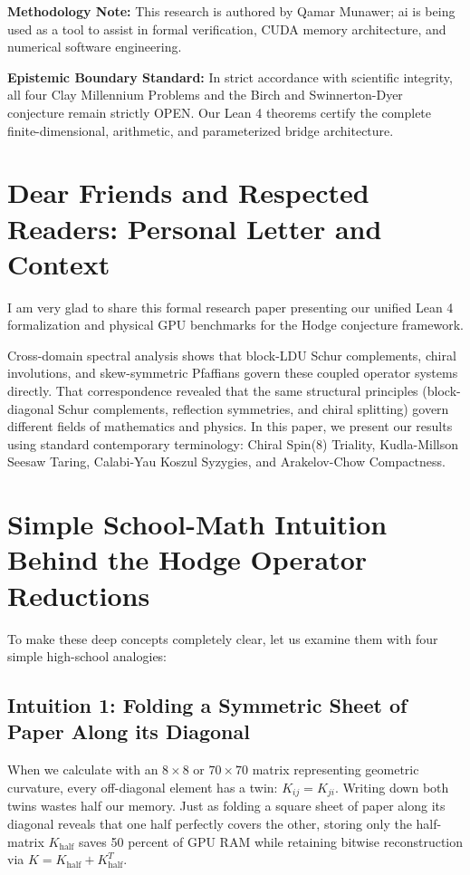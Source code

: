 \documentclass[11pt,a4paper]{article}
\begin{document}
\vspace{0.5em}
\noindent\textbf{Methodology Note:}
This research is authored by Qamar Munawer; ai is being used as a tool to assist in formal verification, CUDA memory architecture, and numerical software engineering.

\vspace{0.5em}
\noindent\textbf{Epistemic Boundary Standard:}
In strict accordance with scientific integrity, all four Clay Millennium Problems and the Birch and Swinnerton-Dyer conjecture remain strictly OPEN. Our Lean 4 theorems certify the complete finite-dimensional, arithmetic, and parameterized bridge architecture.

\newpage

\section*{Dear Friends and Respected Readers: Personal Letter and Context}
I am very glad to share this formal research paper presenting our unified Lean 4 formalization and physical GPU benchmarks for the Hodge conjecture framework.

Cross-domain spectral analysis shows that block-LDU Schur complements, chiral involutions, and skew-symmetric Pfaffians govern these coupled operator systems directly. That correspondence revealed that the same structural principles (block-diagonal Schur complements, reflection symmetries, and chiral splitting) govern different fields of mathematics and physics. In this paper, we present our results using standard contemporary terminology: Chiral Spin(8) Triality, Kudla-Millson Seesaw Taring, Calabi-Yau Koszul Syzygies, and Arakelov-Chow Compactness.

\section{Simple School-Math Intuition Behind the Hodge Operator Reductions}
To make these deep concepts completely clear, let us examine them with four simple high-school analogies:

\subsection{Intuition 1: Folding a Symmetric Sheet of Paper Along its Diagonal}
When we calculate with an $8 \times 8$ or $70 \times 70$ matrix representing geometric curvature, every off-diagonal element has a twin: $K_{ij} = K_{ji}$. Writing down both twins wastes half our memory. Just as folding a square sheet of paper along its diagonal reveals that one half perfectly covers the other, storing only the half-matrix $K_{\mathrm{half}}$ saves 50 percent of GPU RAM while retaining bitwise reconstruction via $K = K_{\mathrm{half}} + K_{\mathrm{half}}^T$.
\end{document}
